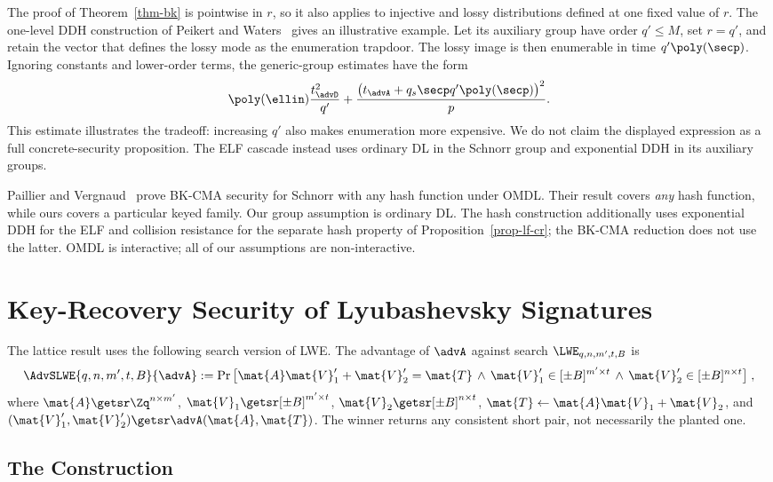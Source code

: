 The proof of Theorem~\ref{thm-bk} is pointwise in $r$, so it also applies to injective and lossy distributions defined at one fixed value of $r$. The one-level DDH construction of Peikert and Waters~\cite[Sections~5.2--5.3]{STOC:PeiWat08} gives an illustrative example. Let its auxiliary group have order $q'\le M$, set $r=q'$, and retain the vector that defines the lossy mode as the enumeration trapdoor. The lossy image is then enumerable in time $q'\poly(\secp)$. Ignoring constants and lower-order terms, the generic-group estimates have the form
$$
\poly(\ellin)\frac{t_{\advD}^2}{q'}
+
\frac{\bigl(t_{\advA}+q_s\secp q'\poly(\secp)\bigr)^2}{p}.
$$
This estimate illustrates the tradeoff: increasing $q'$ also makes enumeration more expensive. We do not claim the displayed expression as a full concrete-security proposition. The ELF cascade instead uses ordinary DL in the Schnorr group and exponential DDH in its auxiliary groups.

Paillier and Vergnaud~\cite{AC:PaiVer05} prove BK-CMA security for Schnorr with any hash function under OMDL. Their result covers \emph{any} hash function, while ours covers a particular keyed family. Our group assumption is ordinary DL. The hash construction additionally uses exponential DDH for the ELF and collision resistance for the separate hash property of Proposition~\ref{prop-lf-cr}; the BK-CMA reduction does not use the latter. OMDL is interactive; all of our assumptions are non-interactive.

\section{Key-Recovery Security of Lyubashevsky Signatures}

The lattice result uses the following search version of LWE. The advantage of $\advA$ against search $\LWE_{q,n,m',t,B}$ is
$$
\AdvSLWE{q,n,m',t,B}{\advA}
:=
\Pr\big[\mat{A}\mat{V}_1' + \mat{V}_2' = \mat{T} \,\land\, \mat{V}_1' \in [\pm B]^{m'\times t} \,\land\, \mat{V}_2' \in [\pm B]^{n\times t}\big] \;,
$$
where $\mat{A} \getsr \Zq^{n\times m'}$, $\mat{V}_1 \getsr [\pm B]^{m'\times t}$, $\mat{V}_2 \getsr [\pm B]^{n\times t}$, $\mat{T} \gets \mat{A}\mat{V}_1+\mat{V}_2$, and $(\mat{V}_1',\mat{V}_2') \getsr \advA(\mat{A},\mat{T})$. The winner returns any consistent short pair, not necessarily the planted one.

\subsection{The Construction} \label{sec-dil-bk}

